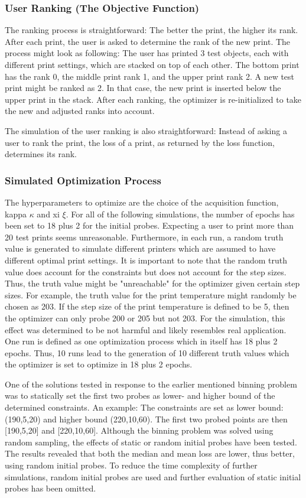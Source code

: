 \subsubsection{User Ranking (The Objective Function)}
The ranking process is straightforward: The better the print, the higher its rank. After each print, the user is asked to determine the rank of the new print. The process might look as following: The user has printed 3 test objects, each with different print settings, which are stacked on top of each other. The bottom print has the rank 0, the middle print rank 1, and the upper print rank 2. A new test print might be ranked as 2. In that case, the new print is inserted below the upper print in the stack. After each ranking, the optimizer is re-initialized to take the new and adjusted ranks into account.

The simulation of the user ranking is also straightforward: Instead of asking a user to rank the print, the loss of a print, as returned by the loss function, determines its rank. 

\newpage
\subsubsection{Simulated Optimization Process}

The hyperparameters to optimize are the choice of the acquisition function, kappa $\kappa$ and xi $\xi$. For all of the following simulations, the number of epochs has been set to 18 plus 2 for the initial probes.  Expecting a user to print more than 20 test prints seems unreasonable. Furthermore, in each run, a random truth value is generated to simulate different printers which are assumed to have different optimal print settings. It is important to note that the random truth value does account for the constraints but does not account for the step sizes. Thus, the truth value might be "unreachable" for the optimizer given certain step sizes. For example, the truth value for the print temperature might randomly be chosen as 203. If the step size of the print temperature is defined to be 5, then the optimizer can only probe 200 or 205 but not 203. For the simulation, this effect was determined to be not harmful and likely resembles real application. One run is defined as one optimization process which in itself has 18 plus 2 epochs. Thus, 10 runs lead to the generation of 10 different truth values which the optimizer is set to optimize in 18 plus 2 epochs. 

One of the solutions tested in response to the earlier mentioned binning problem was to statically set the first two probes as lower- and higher bound of the determined constraints. An example: The constraints are set as lower bound: (190,5,20) and higher bound (220,10,60). The first two probed points are then [190,5,20] and [220,10,60]. Although the binning problem was solved using random sampling, the effects of static or random initial probes have been tested. The results revealed that both the median and mean loss are lower, thus better, using random initial probes. To reduce the time complexity of further simulations, random initial probes are used and further evaluation of static initial probes has been omitted. 

